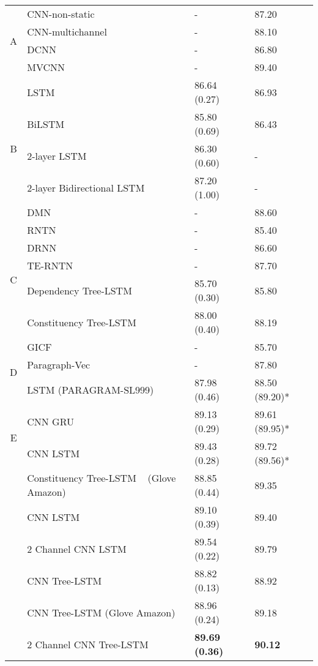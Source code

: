 \begin{table*}[]
\begin{tabular}{c|lll}
		\multirow{4}{*}{A} & CNN-non-static~\cite{KimCNN} & - & 87.20\Tstrut \\
		& CNN-multichannel~\cite{KimCNN} & - & 88.10 \\
		& DCNN~\cite{DCNN} & - & 86.80 \\
		& MVCNN~\cite{2-layer-cnn} & - & 89.40 \\
		\hline
		\multirow{5}{*}{B} & LSTM~\cite{originLSTM}    & 86.64 (0.27) & 86.93  \\
		& BiLSTM~\cite{GravesLSTM}  & 85.80 (0.69) & 86.43   \\
		& 2-layer LSTM~\cite{GravesLSTM} & 86.30 (0.60) & - \\
		& 2-layer Bidirectional LSTM~\cite{GravesLSTM} & 87.20 (1.00) & - \\
		& DMN~\cite{attention-gru} & - & 88.60 \\
		\hline
		\multirow{5}{*}{C} & RNTN~\cite{socher2013recursive}  & - & 85.40  \\
		& DRNN~\cite{IrsoyDRNN} & - & 86.60 \\
		& TE-RNTN~\cite{tag-embedding-rnn} & - & 87.70 \\
		& Dependency Tree-LSTM  ~\cite{treeLSTM}  & 85.70 (0.30)  & 85.80 \\
		& Constituency Tree-LSTM ~\cite{treeLSTM} & 88.00 (0.40)    &   88.19\\
		\hline
		\multirow{3}{*}{D} & GICF~\cite{group-instance} & - & 85.70 \\
		& Paragraph-Vec~\cite{ParagraphVec} & - & 87.80 \\
		& LSTM (PARAGRAM-SL999)~\cite{wieting2015towards} & 87.98 (0.46) & 88.50 (89.20)*
		\\
		\hline
		\multirow{2}{*}{E}  & CNN GRU ~\cite{cnn-rnn}                    & 89.13 (0.29)  &  89.61 (89.95)*    \\
		& CNN LSTM ~\cite{cnn-rnn}                    & 89.43 (0.28)  & 89.72 (89.56)*\Bstrut    \\
		\Xhline{3\arrayrulewidth}
		\Xhline{3\arrayrulewidth}
		\multirow{6}{*}{F} & Constituency Tree-LSTM ~\cite{treeLSTM} (Glove Amazon) & 88.85 (0.44) & 89.35 \\
		 & CNN LSTM                                 & 89.10 (0.39)  & 89.40  \\
		& 2 Channel CNN LSTM                        & 89.54    (0.22) & 89.79    \\
		 & CNN Tree-LSTM                            & 88.82 (0.13) & 88.92 \\
		& CNN Tree-LSTM (Glove Amazon)             & 88.96 (0.24) & 89.18 \\
		& 2 Channel CNN Tree-LSTM  &\textbf{89.69 (0.36)} & \textbf{90.12}    \\
	\end{tabular}
\end{table*}
